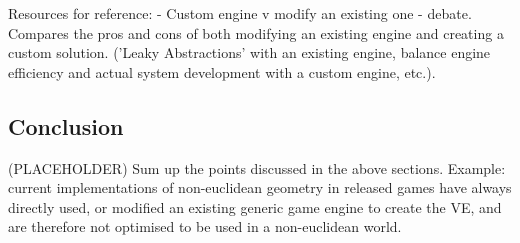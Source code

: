 		Resources for reference:
		\cite{Bruce2012} - Custom engine v modify an existing one - debate. Compares the pros and cons of both modifying an existing engine and creating a custom solution. ('Leaky Abstractions' with an existing engine, balance engine efficiency and actual system development with a custom engine, etc.).
		
	\subsection{Conclusion}
	\label{lr:cross:conclusion}
		(PLACEHOLDER) Sum up the points discussed in the above sections. Example: current implementations of non-euclidean geometry in released games have always directly used, or modified an existing generic game engine to create the VE, and are therefore not optimised to be used in a non-euclidean world.
	
